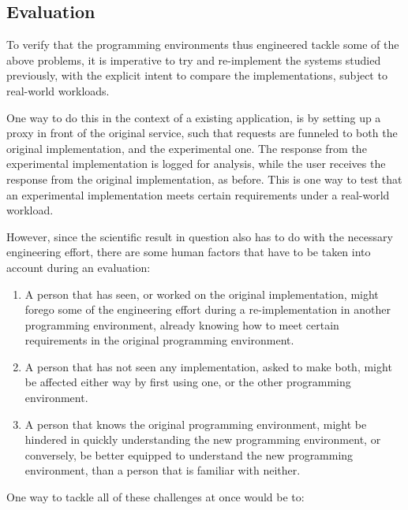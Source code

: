 \subsection{Evaluation}

To verify that the programming environments thus engineered tackle
some of the above problems, it is imperative to try and re-implement
the systems studied previously, with the explicit intent to compare
the implementations, subject to real-world workloads.

One way to do this in the context of a existing application, is by
setting up a proxy in front of the original service, such that
requests are funneled to both the original implementation, and the
experimental one. The response from the experimental implementation is
logged for analysis, while the user receives the response from the
original implementation, as before. This is one way to test that an
experimental implementation meets certain requirements under a
real-world workload.

However, since the scientific result in question also has to do with
the necessary engineering effort, there are some human factors that
have to be taken into account during an evaluation:

\begin{enumerate}

\item A person that has seen, or worked on the original
implementation, might forego some of the engineering effort during a
re-implementation in another programming environment, already knowing
how to meet certain requirements in the original programming
environment.

\item A person that has not seen any implementation, asked to make
both, might be affected either way by first using one, or the other
programming environment.

\item A person that knows the original programming environment, might
be hindered in quickly understanding the new programming environment,
or conversely, be better equipped to understand the new programming
environment, than a person that is familiar with neither.

\end{enumerate}

One way to tackle all of these challenges at once would be to:

